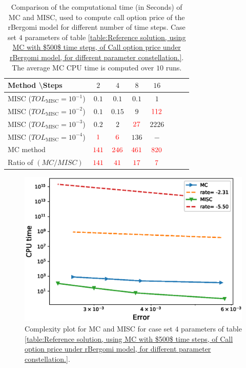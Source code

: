 \FloatBarrier
\begin{table}[h!]
	\centering
	\begin{tabular}{l*{6}{c}r}
		Method \textbackslash  Steps            & $2$ & $4$ & $8$ & $16$ &   \\
		\hline
		MISC ($TOL_{\text{MISC}}=10^{-1}$)  & $0.1$ & $0.1$ & $0.1$ & $1$ \\
		MISC ($TOL_{\text{MISC}}=10^{-2}$)  & $0.1$ & $0.15$ & $9$ & $\red{112}$ \\
		MISC ($TOL_{\text{MISC}}=10^{-3}$)  & $0.2$ & $2$ & $\red{27}$ & $2226$ \\
		MISC ($TOL_{\text{MISC}}=10^{-4}$)  & $\red{1}$ & $\red{6}$ & $136$ & $-$\\
		\hline
		MC method   & $ \red{141}
		
		$  & $  \red{246}$  & $  \red{461}$ & $ \red{820}
		$  \\	
		\hline
		Ratio of $\left(MC/MISC \right)$ & $ \red{141}
		
		$  & $  \red{
			41
		}$  & $  \red{    17
		}$ & $ \red{ 7}
		$  \\	
%		
		\hline
	\end{tabular}
	\caption{Comparison of the computational time (in Seconds) of  MC and MISC, used to compute call option price of the rBergomi model for different number of time steps. Case set $4$ parameters of table \ref{table:Reference solution, using MC with $500$ time steps, of Call option price under rBergomi model, for different parameter constellation.}. The average  MC CPU time is computed over $10$ runs. }
	\label{Comparsion of the computational time of  MC and MISC, used to compute Call option price of rBergomi model for different number of time steps. Case set4}
\end{table}


\FloatBarrier

	\begin{figure}[h!]
	\centering
	\includegraphics[width=0.4\linewidth]{./figures/rBergomi_Complexity_rates/set6/error_vs_time_set6}
	
	\caption{Complexity plot for   MC and MISC for case set $4$ parameters of table \ref{table:Reference solution, using MC with $500$ time steps, of Call option price under rBergomi model, for different parameter constellation.}.}
	\label{fig:Complexity plot for MC and MISC for case set $4$ parameters}
\end{figure}
\FloatBarrier

